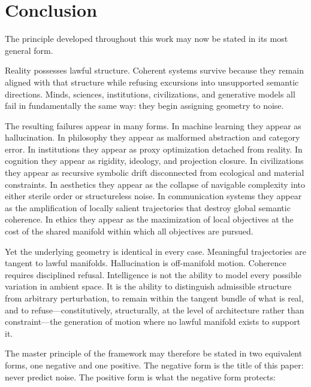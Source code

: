 \documentclass[11pt,a4paper,twocolumn]{article}
\begin{document}

\section*{Conclusion}

The principle developed throughout this work may now be stated in its
most general form.

Reality possesses lawful structure. Coherent systems survive because
they remain aligned with that structure while refusing excursions into
unsupported semantic directions. Minds, sciences, institutions,
civilizations, and generative models all fail in fundamentally the same
way: they begin assigning geometry to noise.

The resulting failures appear in many forms. In machine learning they
appear as hallucination. In philosophy they appear as malformed
abstraction and category error. In institutions they appear as proxy
optimization detached from reality. In cognition they appear as
rigidity, ideology, and projection closure. In civilizations they
appear as recursive symbolic drift disconnected from ecological and
material constraints. In aesthetics they appear as the collapse of
navigable complexity into either sterile order or structureless
noise. In communication systems they appear as the amplification of
locally salient trajectories that destroy global semantic coherence.
In ethics they appear as the maximization of local objectives at the
cost of the shared manifold within which all objectives are pursued.

Yet the underlying geometry is identical in every case. Meaningful
trajectories are tangent to lawful manifolds. Hallucination is
off-manifold motion. Coherence requires disciplined refusal.
Intelligence is not the ability to model every possible variation in
ambient space. It is the ability to distinguish admissible structure
from arbitrary perturbation, to remain within the tangent bundle of
what is real, and to refuse---constitutively, structurally, at the
level of architecture rather than constraint---the generation of motion
where no lawful manifold exists to support it.

The master principle of the framework may therefore be stated
in two equivalent forms, one negative and one positive. The
negative form is the title of this paper: never predict noise.
The positive form is what the negative form protects:
\end{document}

